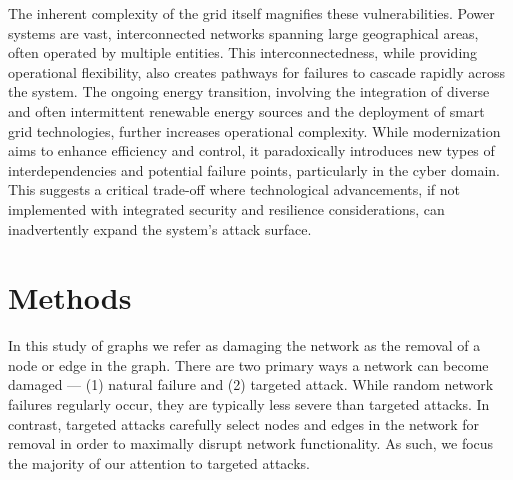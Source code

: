 \documentclass[10pt,twocolumn,letterpaper]{article}
\begin{document}

The inherent complexity of the grid itself magnifies these vulnerabilities. Power systems are vast, interconnected networks spanning large geographical areas, often operated by multiple entities. 
This interconnectedness, while providing operational flexibility, also creates pathways for failures to cascade rapidly across the system. \cite{kelic2017interdependencies} 
The ongoing energy transition, involving the integration of diverse and often intermittent renewable energy sources and the deployment of smart grid technologies, further increases operational complexity. \cite{number14} 
While modernization aims to enhance efficiency and control, it paradoxically introduces new types of interdependencies and potential failure points, particularly in the cyber domain. \cite{CraigFields} 
This suggests a critical trade-off where technological advancements, if not implemented with integrated security and resilience considerations, can inadvertently expand the system's attack surface.


\section{Methods}
\label{sec:methods}


In this study of graphs we refer as damaging the network as the removal of a node or edge in the graph. There are two primary ways a network can become damaged — (1) natural failure and (2) targeted attack. While random network failures regularly occur, they are typically less severe than targeted attacks. In contrast, targeted attacks carefully select nodes and edges in the network for removal in order to maximally disrupt network functionality. As such, we focus the majority of our attention to targeted attacks.
\end{document}
